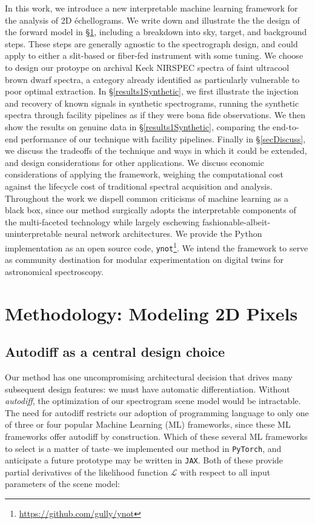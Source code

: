 \documentclass[twocolumn]{aastex631}
\begin{document}
In this work, we introduce a new interpretable machine learning framework for the analysis of 2D \'echellograms.  We write down and illustrate the the design of the forward model in \S \ref{secMethod}, including a breakdown into sky, target, and background steps.  These steps are generally agnostic to the spectrograph design, and could apply to either a slit-based or fiber-fed instrument with some tuning.  We choose to design our protoype on archival Keck NIRSPEC spectra of faint ultracool brown dwarf spectra, a category already identified as particularly vulnerable to poor optimal extraction.  In \S \ref{results1Synthetic}, we first illustrate the injection and recovery of known signals in synthetic spectrograms, running the synthetic spectra through facility pipelines as if they were bona fide observations.  We then show the results on genuine data in \S \ref{results1Synthetic}, comparing the end-to-end performance of our technique with facility pipelines.  Finally in \S \ref{secDiscuss}, we discuss the tradeoffs of the technique and ways in which it could be extended, and design considerations for other applications.  We discuss economic considerations of applying the framework, weighing the computational cost against the lifecycle cost of traditional spectral acquisition and analysis.  Throughout the work we dispell common criticisms of machine learning as a black box, since our method surgically adopts the interpretable components of the multi-faceted technology while largely eschewing fashionable-albeit-uninterpretable neural network architectures.  We provide the Python implementation as an open source code, \texttt{ynot}\footnote{\url{https://github.com/gully/ynot}}.  We intend the framework to serve as community destination for modular experimentation on digital twins for astronomical spectroscopy.


\section{Methodology: Modeling 2D Pixels} \label{secMethod}

\subsection{Autodiff as a central design choice}
Our method has one uncompromising architectural decision that drives many subsequent design features: we must have automatic differentiation.  Without \emph{autodiff}, the optimization of our spectrogram scene model would be intractable.  The need for autodiff restricts our adoption of programming language to only one of three or four popular Machine Learning (ML) frameworks, since these ML frameworks offer autodiff by construction.  Which of these several ML frameworks to select is a matter of taste--we implemented our method in \texttt{PyTorch}, and anticipate a future prototype may be written in \texttt{JAX}.  Both of these provide partial derivatives of the likelihood function $\mathcal{L}$ with respect to all input parameters of the scene model:
\end{document}

